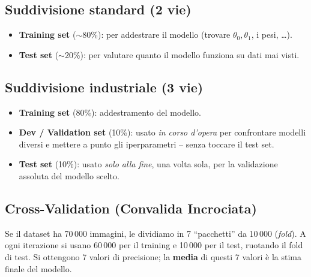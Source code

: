 \subsection{Suddivisione standard (2 vie)}
\begin{itemize}
    \item \textbf{Training set} ($\sim$80\%): per addestrare il modello (trovare $\theta_0, \theta_1$, i pesi, \ldots).
    \item \textbf{Test set} ($\sim$20\%): per valutare quanto il modello funziona su dati mai visti.
\end{itemize}

\subsection{Suddivisione industriale (3 vie)}
\begin{center}
\end{center}

\begin{itemize}
    \item \textbf{Training set} (80\%): addestramento del modello.
    \item \textbf{Dev / Validation set} (10\%): usato \emph{in corso d'opera} per confrontare modelli diversi e mettere a punto gli iperparametri -- senza toccare il test set.
    \item \textbf{Test set} (10\%): usato \emph{solo alla fine}, una volta sola, per la validazione assoluta del modello scelto.
\end{itemize}

\subsection{Cross-Validation (Convalida Incrociata)}

Se il dataset ha 70\,000 immagini, le dividiamo in 7 ``pacchetti'' da 10\,000 (\emph{fold}). A ogni iterazione si usano 60\,000 per il training e 10\,000 per il test, ruotando il fold di test. Si ottengono 7 valori di precisione; la \textbf{media} di questi 7 valori è la stima finale del modello.


